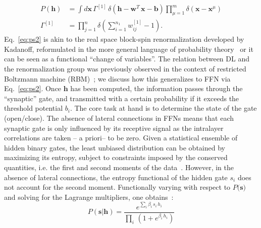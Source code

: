 \documentclass{article}
\begin{document}
%
\begin{align} \label{eq:ps2}
P(\mathbf{h}) &= \int {d\mathbf{x}} \, \Gamma^{[1]} \, \delta\left( \mathbf{h} -  \mathbf{w}^{T} \, \mathbf{x} - \mathbf{b} \right) \prod_{\mu =1}^m  \delta ( \mathbf{x} - \mathbf{x}^{\mu} ) \\ \nonumber
\Gamma^{[1]} &= \prod_{j=1}^n \delta\left( \sum_{i=1}^{n_1} w_{ij}^{[1]} -1 \right).
\end{align}
%
Eq.~\eqref{eq:ps2} is akin to the real space block-spin renormalization developed by Kadanoff, reformulated in the more general language of probability theory~\cite{roberto, ma, cassandro} or it can be seen as a functional ``change of variables''. The relation between  DL and the renormalization group was previously observed in the context of restricted Boltzmann machine (RBM)~\cite{mehta}; we discuss how this generalizes to FFN via Eq.~\eqref{eq:ps2}. Once $\mathbf{h}$ has been computed, the information passes through the ``synaptic'' gate, and transmitted with a certain probability if it exceeds the threshold potential $b_i$. The core task at hand is to determine the state of the gate (open/close). The absence of lateral connections in FFNs means that each synaptic gate is only influenced by its receptive signal as the intralayer correlations are taken -- a priori-- to be zero. Given a statistical ensemble of hidden binary gates, the least unbiased distribution  can be obtained by maximizing its entropy, subject to constraints imposed by the conserved quantities, i.e. the first and second moments of the data~\cite{zecchina, mckay}. However, in the absence of lateral connections, the entropy functional of the hidden gate $s_i$ does not account for the second moment.
%
%
Functionally varying with respect to $P(\mathbf{s)}$ and solving for the Lagrange multipliers, one  obtains~\cite{roberto}:
%
%
\begin{equation} \label{eq:entropy4}
P(\mathbf{s} | \mathbf{h}) = \frac{e^{ \sum_i \beta_i  \, s_i \, h_i }}{\prod_i \, \left( 1+ e^{\beta_i \, h_i} \right)} %
\end{equation}
%
\end{document}
